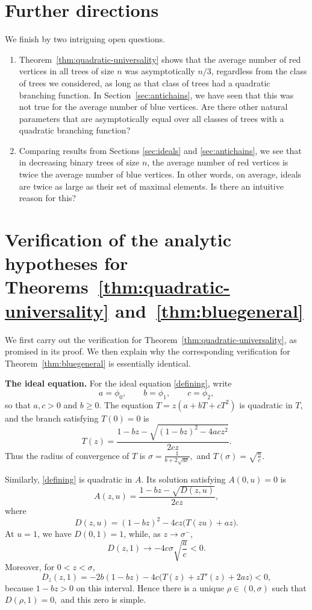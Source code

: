 \documentclass[11pt, onesided]{amsart}
\theoremstyle{remark}
\begin{document}
\section{Further directions}
We finish by two intriguing open questions. 
\begin{enumerate}
\item Theorem~\ref{thm:quadratic-universality} shows that the average number of red vertices
in all trees of size $n$ was asymptotically $n/3$, regardless from the class of trees we considered, 
as long as that class of trees had a quadratic branching function. In Section~\ref{sec:antichains}, we have seen that this was not true for the average number of blue vertices. Are there other natural parameters that are 
asymptotically equal over all classes of trees with a quadratic branching function?
\item Comparing results from Sections \ref{sec:ideals} and \ref{sec:antichains}, we see that in decreasing binary trees of size $n$, the average number
of red vertices is twice the average number of blue vertices. In other words, on average, ideals are twice as large as their set of maximal elements. Is there an intuitive reason for this? 
\end{enumerate}

\appendix
\section{Verification of the analytic hypotheses for Theorems~\ref{thm:quadratic-universality} and~\ref{thm:bluegeneral}}
\label{app:analytic-verification}

We first carry out the verification for
Theorem~\ref{thm:quadratic-universality}, as promised in its proof.  We then
explain why the corresponding verification for
Theorem~\ref{thm:bluegeneral} is essentially identical.

\medskip
\noindent\textbf{The ideal equation.}
For the ideal
equation \eqref{defining}, write
\[
a=\phi_0,\qquad b=\phi_1,\qquad c=\phi_2,
\]
so that $a,c>0$ and $b\geq 0$.  The equation
$
T=z(a+bT+cT^2)
$
is quadratic in $T$, and the branch satisfying $T(0)=0$ is
\[
T(z)=\frac{1-bz-\sqrt{(1-bz)^2-4ac z^2}}{2cz}.
\]
Thus the radius of convergence of $T$ is
$
\sigma=\frac{1}{b+2\sqrt{ac}},
$
and
$
T(\sigma)=\sqrt{\frac{a}{c}}.
$

Similarly, \eqref{defining} is quadratic in $A$.  Its solution satisfying
$A(0,u)=0$ is
\[
A(z,u)=\frac{1-bz-\sqrt{D(z,u)}}{2cz},
\]
where
\[
D(z,u)=(1-bz)^2-4cz\bigl(T(zu)+az\bigr).
\]
At $u=1$, we have $D(0,1)=1$, while, as $z\to\sigma^-$,
\[
D(z,1)\longrightarrow -4c\sigma\sqrt{\frac{a}{c}}<0.
\]
Moreover, for $0<z<\sigma$,
\[
D_z(z,1)
=-2b(1-bz)-4c\bigl(T(z)+zT'(z)+2az\bigr)<0,
\]
because $1-bz>0$ on this interval.  Hence there is a unique
$\rho\in(0,\sigma)$ such that
$
D(\rho,1)=0,
$
and this zero is simple.
\end{document}
